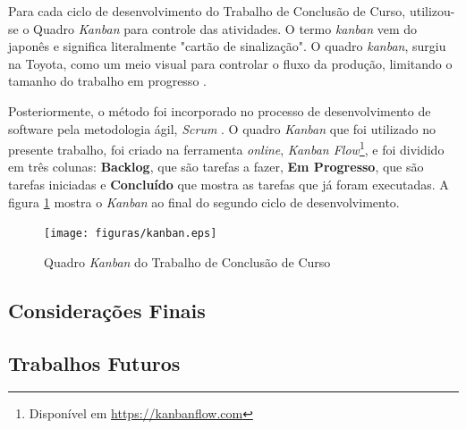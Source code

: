 Para cada ciclo de desenvolvimento do Trabalho de Conclusão de Curso,  
utilizou-se o Quadro \textit{Kanban} para controle das atividades. 
O termo \textit{kanban} vem do japonês e significa literalmente "cartão de 
sinalização". O quadro \textit{kanban}, surgiu na Toyota, como um meio visual 
para controlar o fluxo da produção, limitando o tamanho do trabalho em progresso 
\cite{moura1999kanban}.

Posteriormente, o método foi incorporado no processo de desenvolvimento de
software pela metodologia ágil, \textit{Scrum} \cite{Schwaber:2004}. O quadro
\textit{Kanban} que foi utilizado no presente trabalho, foi criado na ferramenta 
\textit{online}, \textit{Kanban Flow}\footnote{Disponível em
\url{https://kanbanflow.com}}, e foi dividido em três colunas: 
\textbf{Backlog}, que são tarefas a fazer, \textbf{Em Progresso}, que são 
tarefas iniciadas e \textbf{Concluído} que mostra as tarefas que já foram 
executadas. A figura \ref{kanban} mostra o \textit{Kanban} ao final do segundo 
ciclo de desenvolvimento.

\begin{figure}[h]
\centering
	\texttt{[image: figuras/kanban.eps]}
	\caption{Quadro \textit{Kanban} do Trabalho de Conclusão de Curso}
	\label{kanban}
\end{figure}

\subsection{Considerações Finais}

\subsection{Trabalhos Futuros}
